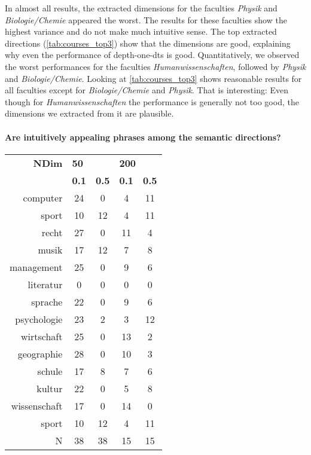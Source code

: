 In almost all results, the extracted dimensions for the faculties \textit{Physik} and \textit{Biologie/Chemie} appeared the worst. The results for these faculties show the highest variance and do not make much intuitive sense. The top extracted directions (\autoref{tab:courses_top3}) show that the dimensions are good, explaining why even the performance of depth-one-\glspl{dt} is good. Quantitatively, we observed the worst performances for the faculties \textit{Humanwissenschaften}, followed by \textit{Physik} and \textit{Biologie/Chemie}. Looking at \autoref{tab:courses_top3} shows reasonable results for all faculties except for \textit{Biologie/Chemie} and \textit{Physik}. That is interesting: Even though for \textit{Humanwissenschaften} the performance is generally not too good, the dimensions we extracted from it are plausible. %

\paragraph{Are intuitively appealing phrases among the semantic directions?}

\begingroup

\renewcommand{\arraystretch}{0.75}
\begin{table}[H]
	\begin{tabular}{rcccc}
	\toprule
	 \textbf{NDim} & \multicolumn{2}{l}{\textbf{50}} & \multicolumn{2}{l}{\textbf{200}} \\
	 & \textbf{0.1} & \textbf{0.5} & \textbf{0.1} & \textbf{0.5}  \\
	\midrule
	computer & 24 & 0 & 4 & 11 \\
	sport & 10 & 12 & 4 & 11 \\
	recht & 27 & 0 & 11 & 4 \\
	musik & 17 & 12 & 7 & 8 \\
	management & 25 & 0 & 9 & 6 \\
	literatur & 0 & 0 & 0 & 0 \\
	sprache & 22 & 0 & 9 & 6 \\
	psychologie & 23 & 2 & 3 & 12 \\
	wirtschaft & 25 & 0 & 13 & 2 \\
	geographie & 28 & 0 & 10 & 3 \\
	schule & 17 & 8 & 7 & 6 \\
	kultur & 22 & 0 & 5 & 8 \\
	wissenschaft & 17 & 0 & 14 & 0 \\
	sport & 10 & 12 & 4 & 11 \\
	N & 38 & 38 & 15 & 15 \\
	\bottomrule
\end{tabular}
\label{tab:appealing_phrases}
\end{table}
\endgroup
	

